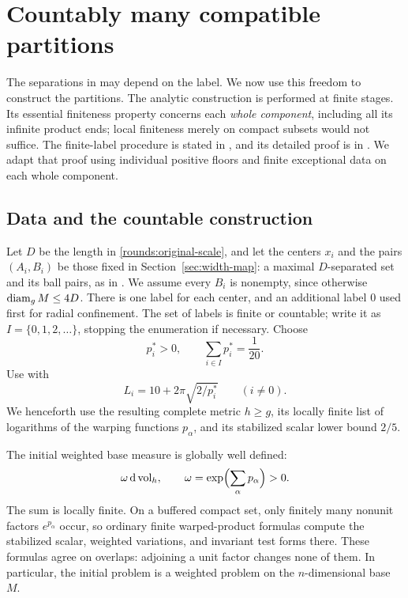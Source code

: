 \section{Countably many compatible partitions}\label{sec:countable}

The separations in  may depend on the label.
We now use this freedom to construct the partitions. The analytic
construction is performed at finite stages. Its essential finiteness
property concerns each \emph{whole component}, including all its infinite
product ends; local finiteness merely on compact subsets would not
suffice. The finite-label procedure is stated in , and its detailed
proof is in .
We adapt that proof using individual positive floors and finite
exceptional data on each whole component.

\subsection{Data and the countable construction}

Let $D$ be the length in \eqref{rounds:original-scale}, and let the
centers $x_i$ and the pairs $(A_i,B_i)$ be those fixed in
Section~\ref{sec:width-map}: a maximal $D$-separated set and its ball
pairs, as in . We assume every $B_i$ is nonempty, since otherwise
$\operatorname{diam}_g M\le4D$. There is one label for each center, and an additional
label $0$ used first for radial confinement. The set of labels is finite
or countable; write it as $I=\{0,1,2,\ldots\}$, stopping the enumeration
if necessary. Choose
\begin{equation}\label{countable:floors}
 p_i^*>0,\qquad \sum_{i\in I}p_i^*=\frac1{20}.
\end{equation}
Use  with
\begin{equation}\label{countable:widths}
 L_i=10+2\pi\sqrt{2/p_i^*}\qquad(i\ne0).
\end{equation}
We henceforth use the resulting complete metric $h\ge g$, its locally
finite list of logarithms of the warping functions $p_\alpha$, and its stabilized scalar lower
bound $2/5$.

The initial weighted base measure is globally well defined:
\[
 \omega\,\mathrm d\operatorname{vol}_h,\qquad
 \omega=\exp\Bigl(\sum_\alpha p_\alpha\Bigr)>0.
\]
The sum is locally finite. On a buffered compact set, only finitely many
nonunit factors $e^{p_\alpha}$ occur, so ordinary finite warped-product
formulas compute the stabilized scalar, weighted variations, and
invariant test forms there. These formulas agree on overlaps: adjoining
a unit factor changes none of them. In particular, the initial problem
is a weighted problem on the $n$-dimensional base $M$.

